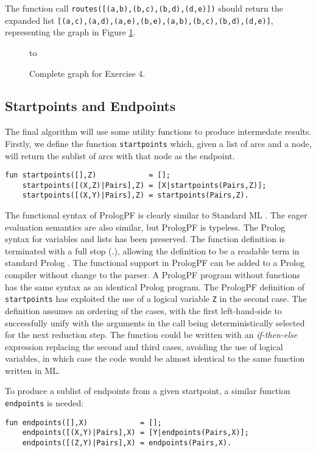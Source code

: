 The function call \texttt{routes([(a,b),(b,c),(b,d),(d,e)])} should return the
expanded list
\texttt{[(a,c),(a,d),(a,e),(b,e),(a,b),(b,c),(b,d),(d,e)]}, representing the
graph in Figure \ref{ex4_2}.

\begin{figure}[htbp]
\vspace{5mm} \hbox to 
\caption{Complete graph for Exercise 4.}
\vspace{5mm}
\label{ex4_2}
\end{figure}

\subsection{Startpoints and Endpoints}

The final algorithm will use some utility functions to produce intermedate results.
Firstly, we define the function \texttt{startpoints} which, given a list
of arcs and a node, will return the sublist of arcs with that node as the endpoint.
\begin{verbatim}
fun startpoints([],Z)            = [];
    startpoints([(X,Z)|Pairs],Z) = [X|startpoints(Pairs,Z)];
    startpoints([(X,Y)|Pairs],Z) = startpoints(Pairs,Z).
\end{verbatim}
The functional syntax of PrologPF is clearly similar to Standard ML \cite{MTH90}.  The
eager evaluation semantics are also similar, but PrologPF is typeless.  The Prolog syntax
for variables and lists has been preserved.
The function definition is terminated with a full stop (.), allowing
the definition to be a readable term in standard Prolog \cite{DEDC96}.  The functional
support in PrologPF can be added to a Prolog compiler without change to the parser.
A PrologPF program without functions has the same syntax as an identical
Prolog program.  The PrologPF definition of \texttt{startpoints} has exploited the
use of a logical variable \texttt{Z} in the second case. The definition assumes an
ordering of the cases, with the first left-hand-side to successfully unify with the 
arguments in the call being
deterministically selected for the next reduction step.  The function could be written
with an \textit{if-then-else} expression replacing the second and third cases, avoiding
the use of logical variables, in which case the code would be almost identical to the
same function written in ML. 

To produce a sublist of endpoints from a given startpoint, a similar function 
\texttt{endpoints} is needed:
\begin{verbatim}
fun endpoints([],X)            = [];
    endpoints([(X,Y)|Pairs],X) = [Y|endpoints(Pairs,X)];
    endpoints([(Z,Y)|Pairs],X) = endpoints(Pairs,X).
\end{verbatim}

